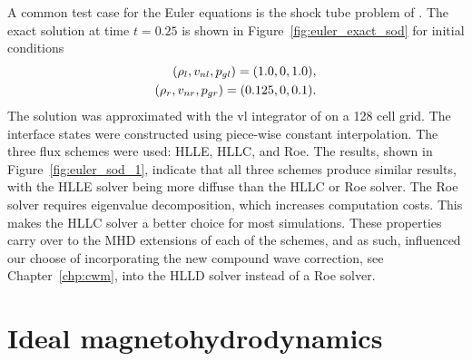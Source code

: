 A common test case for the Euler equations is the shock tube problem of \citet{Sod:1978}.  The exact solution at time $t=0.25$ is shown in Figure~\ref{fig:euler_exact_sod} for initial conditions
\begin{gather}
\begin{split}
\label{eqn:init_sod}
(\rho_l,v_{nl},p_{gl}) = (1.0,0,1.0), \\
(\rho_r,v_{nr},p_{gr}) = (0.125,0,0.1).
\end{split}
\end{gather}
The solution was approximated with the \gls{vl} integrator of \citet{Stone:2009} on a 128 cell grid.  The interface states were constructed using piece-wise constant interpolation.  The three flux schemes were used: HLLE, HLLC, and Roe.  The results, shown in Figure~\ref{fig:euler_sod_1}, indicate that all three schemes produce similar results, with the HLLE solver being more diffuse than the HLLC or Roe solver.  The Roe solver requires eigenvalue decomposition, which increases computation costs.  This makes the HLLC solver a better choice for most simulations.  These properties carry over to the MHD extensions of each of the schemes, and as such, influenced our choose of incorporating the new compound wave correction, see Chapter~\ref{chp:cwm}, into the HLLD solver instead of a Roe solver. 

\section[Ideal magnetohydrodynamics]{Ideal magnetohydrodynamics}
\label{sec:ideal_mhd}

